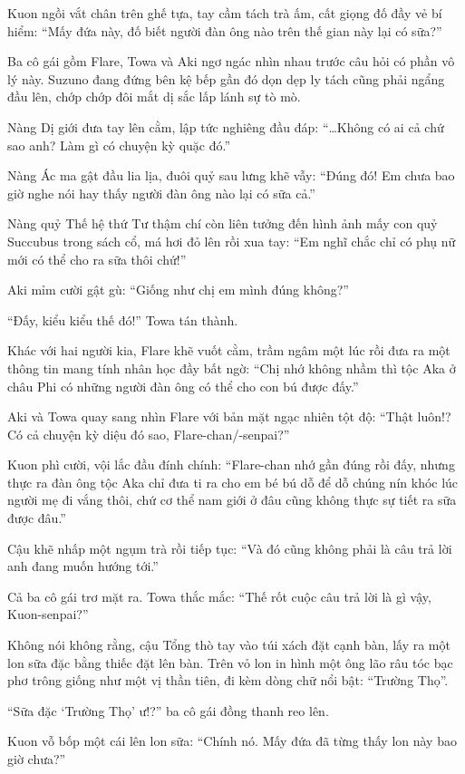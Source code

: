 \documentclass[../main.tex]{subfiles}
\begin{document}
Kuon ngồi vắt chân trên ghế tựa, tay cầm tách trà ấm, cất giọng đố đầy vẻ bí hiểm: ``Mấy đứa này, đố biết người đàn ông nào trên thế gian này lại có sữa?''

Ba cô gái gồm Flare, Towa và Aki ngơ ngác nhìn nhau trước câu hỏi có phần vô lý này. Suzuno đang đứng bên kệ bếp gần đó dọn dẹp ly tách cũng phải ngẩng đầu lên, chớp chớp đôi mắt dị sắc lấp lánh sự tò mò.

Nàng Dị giới đưa tay lên cằm, lập tức nghiêng đầu đáp: ``\dots Không có ai cả chứ sao anh? Làm gì có chuyện kỳ quặc đó.''

Nàng Ác ma gật đầu lia lịa, đuôi quỷ sau lưng khẽ vẫy: ``Đúng đó! Em chưa bao giờ nghe nói hay thấy người đàn ông nào lại có sữa cả.''

Nàng quỷ Thế hệ thứ Tư thậm chí còn liên tưởng đến hình ảnh mấy con quỷ Succubus trong sách cổ, má hơi đỏ lên rồi xua tay: ``Em nghĩ chắc chỉ có phụ nữ mới có thể cho ra sữa thôi chứ!''

Aki mỉm cười gật gù: ``Giống như chị em mình đúng không?''

``Đấy, kiểu kiểu thế đó!'' Towa tán thành.

Khác với hai người kia, Flare khẽ vuốt cằm, trầm ngâm một lúc rồi đưa ra một thông tin mang tính nhân học đầy bất ngờ: ``Chị nhớ không nhầm thì tộc Aka ở châu Phi có những người đàn ông có thể cho con bú được đấy.''

Aki và Towa quay sang nhìn Flare với bản mặt ngạc nhiên tột độ: ``Thật luôn!? Có cả chuyện kỳ diệu đó sao, Flare-chan/-senpai?''

Kuon phì cười, vội lắc đầu đính chính: ``Flare-chan nhớ gần đúng rồi đấy, nhưng thực ra đàn ông tộc Aka chỉ đưa ti ra cho em bé bú dỗ để dỗ chúng nín khóc lúc người mẹ đi vắng thôi, chứ cơ thể nam giới ở đâu cũng không thực sự tiết ra sữa được đâu.''

Cậu khẽ nhấp một ngụm trà rồi tiếp tục: ``Và đó cũng không phải là câu trả lời anh đang muốn hướng tới.''

Cả ba cô gái trơ mặt ra. Towa thắc mắc: ``Thế rốt cuộc câu trả lời là gì vậy, Kuon-senpai?''

Không nói không rằng, cậu Tổng thò tay vào túi xách đặt cạnh bàn, lấy ra một lon sữa đặc bằng thiếc đặt lên bàn. Trên vỏ lon in hình một ông lão râu tóc bạc phơ trông giống như một vị thần tiên, đi kèm dòng chữ nổi bật: ``Trường Thọ''.

``Sữa đặc `Trường Thọ' ư!?'' ba cô gái đồng thanh reo lên.

Kuon vỗ bốp một cái lên lon sữa: ``Chính nó. Mấy đứa đã từng thấy lon này bao giờ chưa?''
\end{document}
